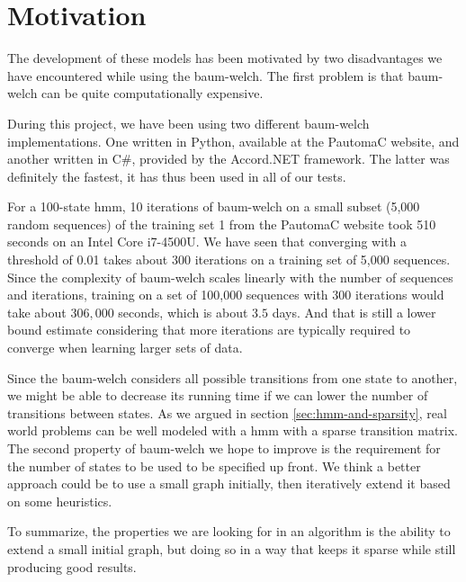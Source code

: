 \section{Motivation}
The development of these models has been motivated by two disadvantages we have encountered while using the \gls{baum-welch}.
The first problem is that \gls{baum-welch} can be quite computationally expensive.

During this project, we have been using two different \gls{baum-welch} implementations. One written in Python, available at the PautomaC website, and another written in C\#, provided by the Accord.NET framework. The latter was definitely the fastest, it has thus been used in all of our tests.

For a 100-state \gls{hmm}, 10 iterations of \gls{baum-welch} on a small subset (5,000 random sequences) of the training set 1 from the PautomaC website took 510 seconds on an Intel Core i7-4500U. We have seen that converging with a threshold of 0.01 takes about 300 iterations on a training set of 5,000 sequences. Since the complexity of \gls{baum-welch} scales linearly with the number of sequences and iterations, training on a set of 100,000 sequences with 300 iterations would take about $306,000$ seconds, which is about $3.5$ days. And that is still a lower bound estimate considering that more iterations are typically required to converge when learning larger sets of data.

Since the \gls{baum-welch} considers all possible transitions from one state to another, we might be able to decrease its running time if we can lower the number of transitions between states. As we argued in section \ref{sec:hmm-and-sparsity}, real world problems can be well modeled with a \gls{hmm} with a sparse transition matrix.
The second property of \gls{baum-welch} we hope to improve is the requirement for the number of states to be used to be specified up front.
We think a better approach could be to use a small graph initially, then iteratively extend it based on some heuristics.

To summarize, the properties we are looking for in an algorithm is the ability to extend a small initial graph, but doing so in a way that keeps it sparse while still producing good results.
